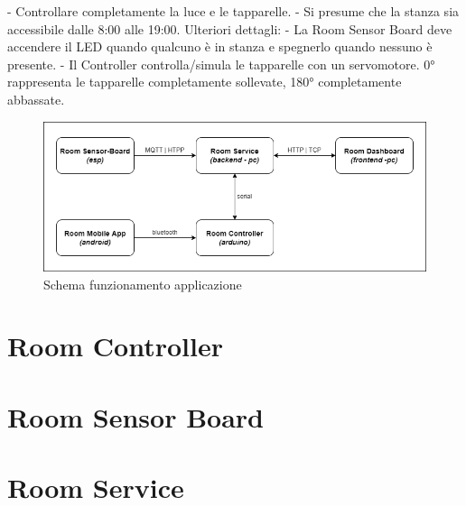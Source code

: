 \documentclass[12pt]{article}
\begin{document}
- Controllare completamente la luce e le tapparelle. \newline
- Si presume che la stanza sia accessibile dalle 8:00 alle 19:00. \newline
Ulteriori dettagli: \newline
- La Room Sensor Board deve accendere il LED quando qualcuno è in stanza e spegnerlo quando nessuno è presente. \newline
- Il Controller controlla/simula le tapparelle con un servomotore. 0° rappresenta le tapparelle completamente sollevate, 180° completamente abbassate.
\vskip 0.3cm
\begin{figure}[H]
    \includegraphics[width=17cm]{application-schema.png}
    \centering
    \caption{Schema funzionamento applicazione}
    \centering
\end{figure}

\newpage

\section{Room Controller}



\newpage

\section{Room Sensor Board}



\newpage

\section{Room Service}



\newpage
\end{document}
